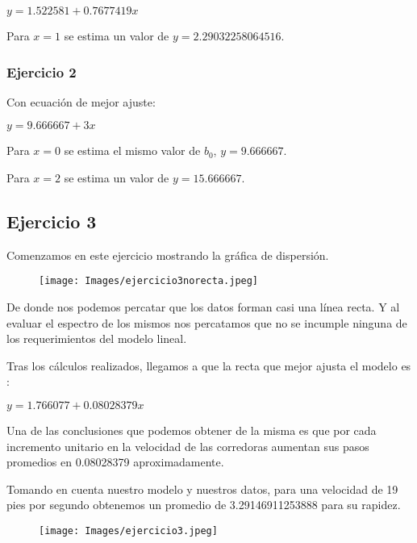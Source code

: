 \documentclass[a4paper,10pt,twocolumn]{article}
\begin{document}
			\begin{center}
				$y = 1.522581 + 0.7677419x$
			\end{center}
			
			Para $x = 1$ se estima un valor de $y = 2.29032258064516$.
			
			\subsubsection{Ejercicio 2}
			
			Con ecuación de mejor ajuste:
			
			\begin{center}
				$y = 9.666667 + 3x$
			\end{center}
			
			
			Para $x = 0$ se estima el mismo valor de $b_0$, $y = 9.666667$.
			
			Para $x = 2$ se estima un valor de $y = 15.666667$.
		
		\subsection{Ejercicio 3}
			Comenzamos en este ejercicio mostrando la gráfica de dispersión.
			
			\begin{figure}[htb]
				\texttt{[image: Images/ejercicio3norecta.jpeg]}
			\end{figure}
		
			De donde nos podemos percatar que los datos forman casi una línea recta. Y al evaluar el espectro de los mismos nos percatamos que no se incumple ninguna de los requerimientos del modelo lineal.
			
			Tras los cálculos realizados, llegamos a que la recta que mejor ajusta el modelo es :
			
			\begin{center}
				$y = 1.766077 + 0.08028379x$
			\end{center}
		
			Una de las conclusiones que podemos obtener de la misma es que por cada incremento unitario en la velocidad de las corredoras aumentan sus pasos promedios en 0.08028379 aproximadamente.
			
			Tomando en cuenta nuestro modelo y nuestros datos, para una velocidad de 19 pies por segundo obtenemos un promedio de 3.29146911253888 para su rapidez.
		
			\begin{figure}[htb]
				\texttt{[image: Images/ejercicio3.jpeg]}
			\end{figure}
		
\end{document}
